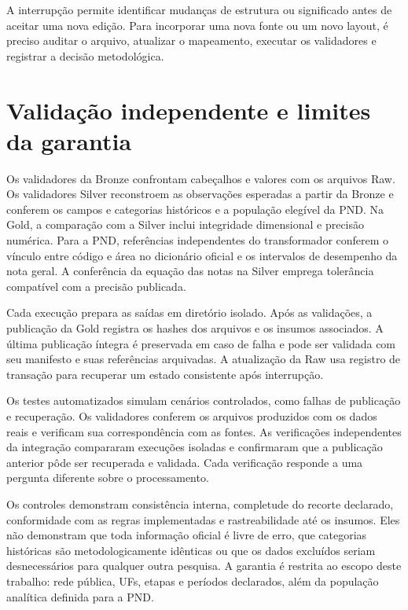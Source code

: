 A interrupção permite identificar mudanças de estrutura ou significado antes de aceitar uma nova edição. Para incorporar uma nova fonte ou um novo layout, é preciso auditar o arquivo, atualizar o mapeamento, executar os validadores e registrar a decisão metodológica.

\section{Validação independente e limites da garantia}

Os validadores da Bronze confrontam cabeçalhos e valores com os arquivos Raw. Os validadores Silver reconstroem as observações esperadas a partir da Bronze e conferem os campos e categorias históricos e a população elegível da PND. Na Gold, a comparação com a Silver inclui integridade dimensional e precisão numérica. Para a PND, referências independentes do transformador conferem o vínculo entre código e área no dicionário oficial e os intervalos de desempenho da nota geral. A conferência da equação das notas na Silver emprega tolerância compatível com a precisão publicada.

Cada execução prepara as saídas em diretório isolado. Após as validações, a publicação da Gold registra os hashes dos arquivos e os insumos associados. A última publicação íntegra é preservada em caso de falha e pode ser validada com seu manifesto e suas referências arquivadas. A atualização da Raw usa registro de transação para recuperar um estado consistente após interrupção.

Os testes automatizados simulam cenários controlados, como falhas de publicação e recuperação. Os validadores conferem os arquivos produzidos com os dados reais e verificam sua correspondência com as fontes. As verificações independentes da integração compararam execuções isoladas e confirmaram que a publicação anterior pôde ser recuperada e validada. Cada verificação responde a uma pergunta diferente sobre o processamento.

Os controles demonstram consistência interna, completude do recorte declarado, conformidade com as regras implementadas e rastreabilidade até os insumos. Eles não demonstram que toda informação oficial é livre de erro, que categorias históricas são metodologicamente idênticas ou que os dados excluídos seriam desnecessários para qualquer outra pesquisa. A garantia é restrita ao escopo deste trabalho: rede pública, UFs, etapas e períodos declarados, além da população analítica definida para a PND.
